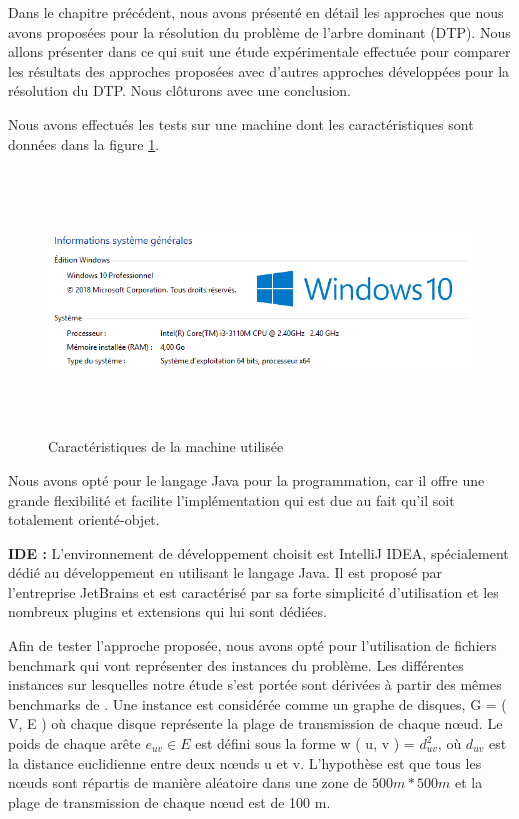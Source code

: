 


Dans le chapitre précédent, nous avons présenté en détail les approches que nous avons proposées pour la résolution du problème de l’arbre dominant (DTP). Nous allons présenter dans ce qui suit une étude expérimentale effectuée pour comparer les résultats des approches proposées avec d’autres approches développées pour la résolution du DTP. Nous clôturons avec une conclusion.



Nous avons effectués les tests sur une machine dont les caractéristiques sont données dans la figure \ref{fig:CMU}.

\begin{figure}[H]
	\centering
	\includegraphics[width=16cm,height=7cm]{Chap5/1.png}
	\caption{Caractéristiques de la machine utilisée}
	\label{fig:CMU}
\end{figure}

Nous avons opté pour le langage Java pour la programmation, car il offre une grande flexibilité et facilite l’implémentation qui est due au fait qu’il soit totalement orienté-objet.

\textbf{IDE :}
L’environnement de développement choisit est IntelliJ IDEA, spécialement dédié au développement en utilisant le langage Java. Il est proposé par l’entreprise JetBrains et est caractérisé par sa forte simplicité d’utilisation et les nombreux plugins et extensions qui lui sont dédiées.

Afin de tester l'approche proposée, nous avons opté pour l'utilisation de fichiers benchmark qui vont représenter des instances du problème. Les différentes instances sur lesquelles notre étude s'est portée sont dérivées à partir des mêmes benchmarks de \cite{sundar2013new}. Une instance est considérée comme un graphe de disques, G = ( V, E ) où chaque disque représente la plage de transmission de chaque nœud. Le poids de chaque arête $e_{uv} \in E $ est défini sous la forme w ( u, v ) = $d_{uv}^2$, où $d_{uv}$  est la distance euclidienne entre deux nœuds u et v. L'hypothèse est que tous les nœuds sont répartis de manière aléatoire dans une zone de $500m * 500m $  et la plage de transmission de chaque nœud est de 100 m.


